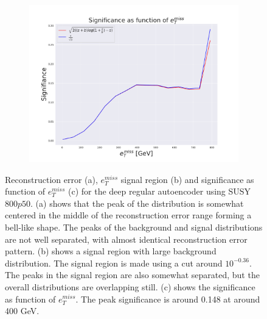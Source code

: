\begin{figure}[H]
    \begin{subfigure}{.40\textwidth}
        \includegraphics[width=\textwidth]{Figures/VAE_testing/big/2lep/significance_etmiss_800p0p050_-0.3616098672654746.pdf}
        \caption{}
        \label{fig:VAE_2lep_big_signi_800_3}
    \end{subfigure}
    \hfill      
    \caption[2lep deep network | $800p50$ | VAE | 3]{Reconstruction error (a), $e_T^{miss}$ signal region (b) and significance as function of 
    $e_T^{miss}$ (c) for the deep regular autoencoder using SUSY $800p50$. 
    (a) shows that the peak of the distribution is somewhat centered in the middle 
    of the reconstruction error range forming a bell-like shape. The peaks of the background and signal 
    distributions are not well separated, with almost identical reconstruction error pattern. (b) 
    shows a signal region with large background distribution. The signal region is made using a cut around
    $10^{-0.36}$. The peaks in the signal region are also somewhat 
    separated, but the overall distributions are overlapping still. 
    (c) shows the significance as function of $e_T^{miss}$. 
    The peak significance is around 0.148 at around 400 GeV.}
    \label{fig:VAE_2lep_big_rec_sig_signi_800_3}
\end{figure}

